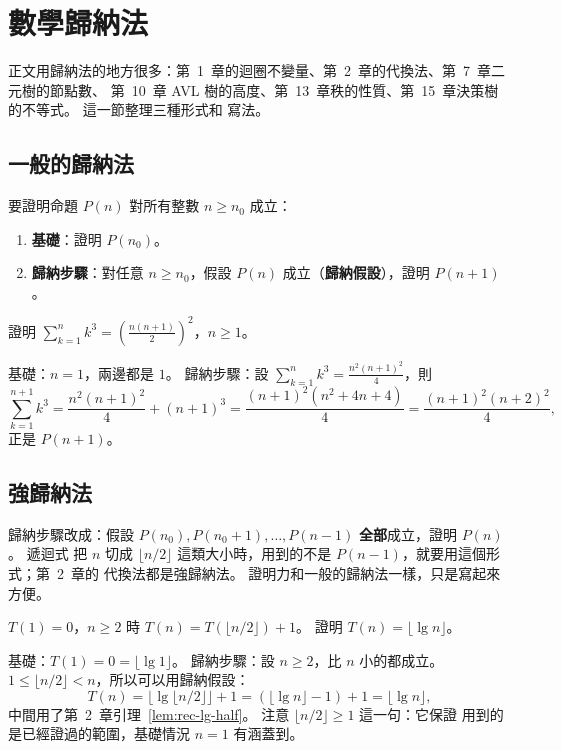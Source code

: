\section{數學歸納法}
\label{sec:mth-induction}

正文用歸納法的地方很多：第~1~章的迴圈不變量、第~2~章的代換法、第~7~章二元樹的節點數、
第~10~章 AVL 樹的高度、第~13~章秩的性質、第~15~章決策樹的不等式。 這一節整理三種形式和
寫法。 

\subsection{一般的歸納法}

要證明命題 $P(n)$ 對所有整數 $n \ge n_0$ 成立：

\begin{enumerate}
\item \textbf{基礎}：證明 $P(n_0)$。
\item \textbf{歸納步驟}：對任意 $n \ge n_0$，假設 $P(n)$ 成立（\textbf{歸納假設}），證明
$P(n+1)$。
\end{enumerate}

證明 $\sum_{k=1}^{n} k^3 = \left(\frac{n(n+1)}{2}\right)^2$，$n \ge 1$。

基礎：$n = 1$，兩邊都是 $1$。 歸納步驟：設 $\sum_{k=1}^{n} k^3 = \frac{n^2(n+1)^2}{4}$，則
\[
\sum_{k=1}^{n+1} k^3 = \frac{n^2(n+1)^2}{4} + (n+1)^3
= \frac{(n+1)^2 (n^2 + 4n + 4)}{4} = \frac{(n+1)^2 (n+2)^2}{4},
\]
正是 $P(n+1)$。

\subsection{強歸納法}

歸納步驟改成：假設 $P(n_0), P(n_0+1), \ldots, P(n-1)$ \textbf{全部}成立，證明 $P(n)$。 遞迴式
把 $n$ 切成 $\lfloor n/2 \rfloor$ 這類大小時，用到的不是 $P(n-1)$，就要用這個形式；第~2~章的
代換法都是強歸納法。 證明力和一般的歸納法一樣，只是寫起來方便。

$T(1) = 0$，$n \ge 2$ 時 $T(n) = T(\lfloor n/2 \rfloor) + 1$。 證明
$T(n) = \lfloor \lg n \rfloor$。

基礎：$T(1) = 0 = \lfloor \lg 1 \rfloor$。 歸納步驟：設 $n \ge 2$，比 $n$ 小的都成立。
$1 \le \lfloor n/2 \rfloor < n$，所以可以用歸納假設：
\[
T(n) = \lfloor \lg \lfloor n/2 \rfloor \rfloor + 1 = (\lfloor \lg n \rfloor - 1) + 1
= \lfloor \lg n \rfloor ,
\]
中間用了第~2~章引理~\ref{lem:rec-lg-half}。 注意 $\lfloor n/2 \rfloor \ge 1$ 這一句：它保證
用到的是已經證過的範圍，基礎情況 $n = 1$ 有涵蓋到。


